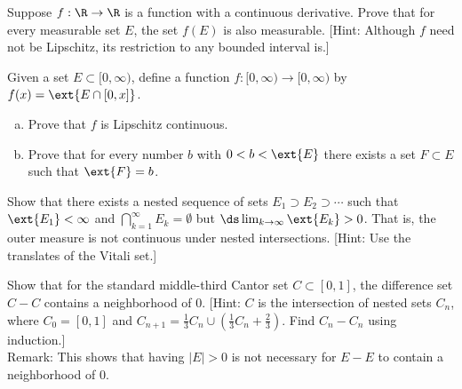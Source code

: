 \begin{hw} \label{hw:11}
Suppose $f: \R \to \R$ is a function with a continuous derivative. Prove that for every measurable set $E$, the set $f(E)$ is also measurable. [Hint: Although $f$ need not be Lipschitz, its restriction to any bounded interval is.] \\
\end{hw}


\begin{hw} \label{hw:12}
Given a set $E \subset [0, \infty)$, define a function $f: [0, \infty) \to [0, \infty)$ by $f(x) = \ext{E \cap [0, x]}$. 
	\begin{enumerate}[(a)]
	\item Prove that $f$ is Lipschitz continuous.
	\item Prove that for every number $b$ with $0<b<\ext{E}$ there exists a set $F \subset E$ such that $\ext{F}= b$. \\
	\end{enumerate}
\end{hw}






\begin{hw} \label{hw:13}
Show that there exists a nested sequence of sets $E_1 \supset E_2 \supset \cdots$ such that $\ext{E_1} < \infty$ and $\bigcap_{k=1}^\infty E_k= \emptyset$ but $\ds\lim_{k \to \infty} \ext{E_k} > 0$. That is, the outer measure is not continuous under nested intersections. [Hint: Use the translates of the Vitali set.] \\
\end{hw}


\begin{hw} \label{hw:14}
Show that for the standard middle-third Cantor set $C \subset [0, 1]$, the difference set $C-C$ contains a neighborhood of $0$. [Hint: $C$ is the intersection of nested sets $C_n$, where $C_0=[0, 1]$  and $C_{n+1}=\frac{1}{3} C_n \cup ( \frac{1}{3} C_n + \frac{2}{3})$. Find $C_n - C_n$ using induction.] \\

\noindent Remark: This shows that having $|E|>0$ is not necessary for $E - E$ to contain a neighborhood of $0$. \\
\end{hw}



